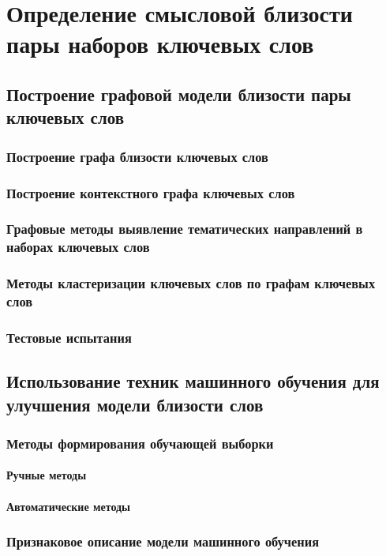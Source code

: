 \chapter{Определение смысловой близости пары наборов ключевых слов} \label{chapt1}

\section{Построение графовой модели близости пары ключевых слов}
\subsection{Построение графа близости ключевых слов} %
\subsection{Построение контекстного графа ключевых слов} %
\subsection{Графовые методы выявление тематических направлений в наборах ключевых слов} %
\subsection{Методы кластеризации ключевых слов по графам ключевых слов}
\subsection{Тестовые испытания}
\section{Использование техник машинного обучения для улучшения модели близости слов}
\subsection{Методы формирования обучающей выборки}
\subsubsection{Ручные методы}
\subsubsection{Автоматические методы}
\subsection{Признаковое описание модели машинного обучения}
